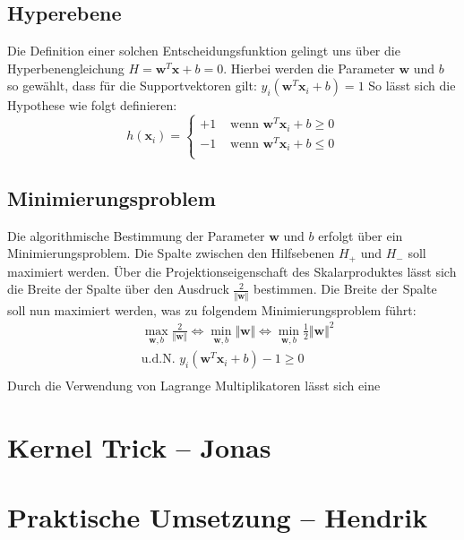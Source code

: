 \documentclass[10pt,a4paper]{scrartcl}
\begin{document}
\begin{multicols}{2}
        \subsection{Hyperebene}
            Die Definition einer solchen Entscheidungsfunktion gelingt uns über die Hyperbenengleichung $H = \boldsymbol{w}^T \boldsymbol{x} + b = 0$. 
            Hierbei werden die Parameter $\boldsymbol{w}$ und $b$ so gewählt, dass für die Supportvektoren gilt: $y_i ( \boldsymbol{w}^T \boldsymbol{x}_i + b ) = 1$
            So lässt sich die Hypothese wie folgt definieren:
            \begin{equation*}
                h(\boldsymbol{x}_i) = \begin{cases}
                    +1 & \text{ wenn } \boldsymbol{w}^T \boldsymbol{x}_i + b \geq 0 \\
                    -1 & \text{ wenn } \boldsymbol{w}^T \boldsymbol{x}_i + b \leq 0 \\
                \end{cases}
            \end{equation*}

        \subsection{Minimierungsproblem}
            Die algorithmische Bestimmung der Parameter $\boldsymbol{w}$ und $b$ erfolgt über ein Minimierungsproblem. Die Spalte zwischen den Hilfsebenen $H_+$ und $H_-$ soll maximiert werden. Über die Projektionseigenschaft des Skalarproduktes lässt sich die Breite der Spalte über den Ausdruck $\frac{2}{\Vert \boldsymbol{w} \Vert}$ bestimmen. Die Breite der Spalte soll nun maximiert werden, was zu folgendem Minimierungsproblem führt:
            \begin{align*}
                & \max_{\boldsymbol{w}, b} \frac{2}{\Vert \boldsymbol{w} \Vert} \Leftrightarrow \min_{\boldsymbol{w}, b} \Vert \boldsymbol{w} \Vert \Leftrightarrow \min_{\boldsymbol{w}, b} \frac{1}{2} \Vert \boldsymbol{w} \Vert^2 \\
                & \text{u.d.N. } y_i ( \boldsymbol{w}^T \boldsymbol{x}_i + b ) - 1 \geq 0 \\
            \end{align*}
            Durch die Verwendung von Lagrange Multiplikatoren lässt sich eine 
    \section{Kernel Trick -- Jonas}

    \section{Praktische Umsetzung -- Hendrik}


    \end{multicols}
\end{document}
